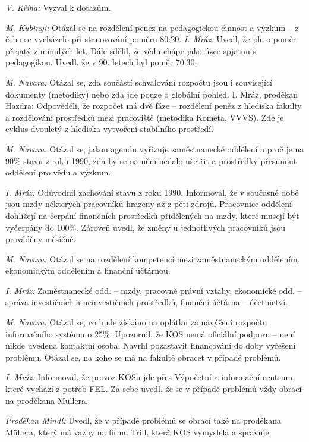 \documentclass[a4paper,12pt,notitlepage,oneside]{article}
\begin{document}
\bigskip

\textit{V. Kříha:} Vyzval k dotazům.

\textit{M. Kubínyi:} Otázal se na rozdělení peněz na pedagogickou činnost a výzkum – z čeho se vycházelo při stanovování poměru 80:20.
\textit{I. Mráz:} Uvedl, že jde o poměr přejatý z minulých let. Dále sdělil, že vědu chápe jako úzce spjatou s pedagogikou. Uvedl, že v 90. letech byl poměr 70:30.

\textit{M. Navara:} Otázal se, zda součástí schvalování rozpočtu jsou i související dokumenty (metodiky) nebo zda jde pouze o globální pohled.
I. Mráz, proděkan Hazdra: Odpověděli, že rozpočet má dvě fáze – rozdělení peněz z hlediska fakulty a rozdělování prostředků mezi pracoviště (metodika Kometa, VVVS). Zde je cyklus dvouletý z hlediska vytvoření stabilního prostředí.

\textit{M. Navara:} Otázal se, jakou agendu vyřizuje zaměstnanecké oddělení a
proč je na 90\% stavu z roku 1990, zda by se na něm nedalo ušetřit a
prostředky přesunout oddělení pro vědu a výzkum.

\textit{I. Mráz:} Odůvodnil zachování stavu z roku 1990. Informoval, že v současné době jsou mzdy některých pracovníků hrazeny až z pěti zdrojů. Pracovnice oddělení dohlížejí na čerpání finančních prostředků přidělených na mzdy, které musejí být vyčerpány do 100\%. Zároveň uvedl, že změny u jednotlivých pracovníků jsou prováděny měsíčně.

\textit{M. Navara:} Otázal se na rozdělení kompetencí mezi zaměstnaneckým oddělením, ekonomickým oddělením a finanční účtárnou.

\textit{I. Mráz:} Zaměstnanecké odd. – mzdy, pracovně právní vztahy, ekonomické odd. – správa investičních a neinvestičních prostředků, finanční účtárna – účetnictví.

\textit{M. Navara:} Otázal se, co bude získáno na oplátku za navýšení rozpočtu informačního systému o 25\%. Upozornil, že KOS nemá oficiální podporu – není nikde uvedena kontaktní osoba. Navrhl pozastavit financování do doby vyřešení problému. Otázal se, na koho se má na fakultě obracet v případě problémů.

\textit{I. Mráz:} Informoval, že provoz KOSu jde přes Výpočetní a informační centrum, které vychází z potřeb FEL. Za sebe uvedl, že se v případě problémů vždy obrací na proděkana Müllera.

\textit{Proděkan Mindl:} Uvedl, že v případě problémů se obrací také na proděkana Müllera, který má vazby na firmu Trill, která KOS vymyslela a spravuje.
\end{document}
